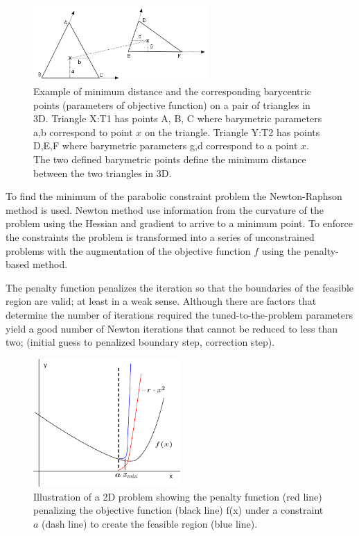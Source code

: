 \documentclass[times,12pt]{article}
\begin{document}
\begin{figure}[!h]
\centering
\includegraphics[width=0.6\textwidth]{c} \protect\caption{\label{mindistance}Example of minimum distance and the corresponding barycentric points (parameters of objective function) on a pair of triangles in 3D. Triangle X:T1 has points A, B, C where barymetric parameters a,b correspond to point $x$ on the triangle. Triangle Y:T2 has points D,E,F where barymetric parameters g,d correspond to a point $x$. The two defined barymetric points define the minimum distance between the two triangles in 3D.}
\end{figure} 

To find the minimum of the parabolic constraint problem the Newton-Raphson method is used. Newton method use information from the curvature of the problem using the Hessian and gradient to arrive to a minimum point. To enforce the constraints the problem is transformed into a series of unconstrained problems with the augmentation of the objective function $f$ using the penalty-based method.

The penalty function penalizes the iteration so that the boundaries of the feasible region are valid; at least in a weak sense. Although there are factors that determine the number of iterations required the tuned-to-the-problem parameters yield a good number of Newton iterations that cannot be reduced to less than two; (initial guess to penalized boundary step, correction step).

\begin{figure}[!h]
\centering
\includegraphics[width=0.5\textwidth]{penalty} \protect\caption{\label{penaltyfig}Illustration of a 2D problem showing the penalty function (red line) penalizing the objective function (black line) f(x) under a constraint $a$ (dash line) to create the feasible region (blue line).}
\end{figure} 
\end{document}
